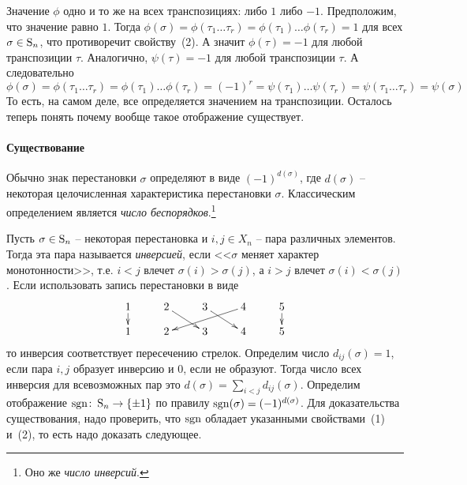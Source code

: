 Значение $\phi$ одно и то же на всех транспозициях: либо $1$ либо $-1$. Предположим, что значение равно $1$. Тогда $\phi(\sigma) = \phi(\tau_1\ldots\tau_r) = \phi(\tau_1)\ldots\phi(\tau_r) = 1$ для всех $\sigma\in\operatorname{S}_{n}$, что противоречит свойству~(2). А значит $\phi(\tau) = -1$ для любой транспозиции $\tau$. Аналогично, $\psi(\tau) = -1$ для любой транспозиции $\tau$. А следовательно
\[
\phi(\sigma) = \phi(\tau_1\ldots\tau_r) = \phi(\tau_1)\ldots\phi(\tau_r) = (-1)^r =\psi(\tau_1)\ldots\psi(\tau_r) = \psi(\tau_1\ldots\tau_r)=\psi(\sigma)
\]
То есть, на самом деле, все определяется значением на транспозиции. Осталось теперь понять почему вообще такое отображение существует.

\paragraph{Существование}

Обычно знак перестановки $\sigma$ определяют в виде $(-1)^{d(\sigma)}$, где $d(\sigma)$ -- некоторая целочисленная характеристика перестановки $\sigma$. Классическим определением является {\it число беспорядков}.\footnote{Оно же {\it число инверсий}.} 

Пусть $\sigma \in\operatorname{S}_{n}$ -- некоторая перестановка и $i,j\in X_n$ -- пара различных элементов. Тогда эта пара называется {\it инверсией}, если <<$\sigma$ меняет характер монотонности>>, т.е. $i<j$ влечет $\sigma(i)>\sigma(j)$, а $i>j$ влечет $\sigma(i)<\sigma(j)$. Если использовать запись перестановки в виде
\[
\xymatrix@R=10pt{
	{1}\ar[d]&{2}\ar[dr]&{3}\ar[dr]&{4}\ar[dll]&{5}\ar[d]\\
	{1}&{2}&{3}&{4}&{5}
}
\]
то инверсия соответствует пересечению стрелок. Определим число $d_{ij}(\sigma) = 1$, если пара $i, j$ образует инверсию и $0$, если не образуют. Тогда число всех инверсия для всевозможных пар это $d(\sigma) = \sum_{i < j} d_{ij}(\sigma)$. Определим отображение $\operatorname{sgn}\colon \operatorname{S}_{n}\to \{\pm 1\}$ по правилу $\operatorname{sgn}(\sigma) = (-1)^{d(\sigma)}$. Для доказательства существования, надо проверить, что $\operatorname{sgn}$ обладает указанными свойствами~(1) и~(2), то есть надо доказать следующее.

